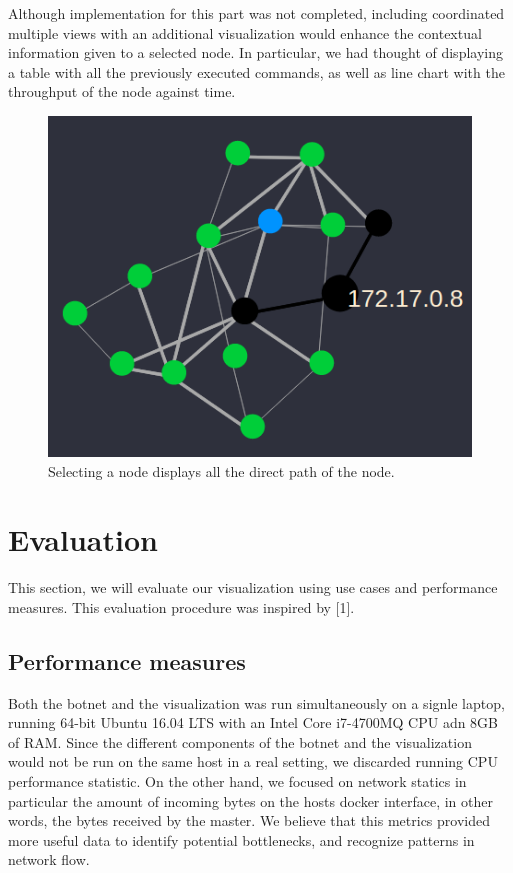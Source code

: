 \documentclass{proc}
\begin{document}
Although implementation for this part was not completed, including coordinated multiple views with an additional visualization would enhance the contextual information given to a selected node. In particular, we had thought of displaying a table with all the previously executed commands, as
well as line chart with the throughput of the node against time.

\begin{figure}
  \includegraphics[width=\linewidth]{network_select.png}
  \caption{Selecting a node displays all the direct path of the node.}
  \label{fig3 :node select}
\end{figure}


\section{Evaluation}
This section, we will evaluate our visualization using use cases and performance measures. This evaluation procedure was inspired by [1].

\subsection{Performance measures}



Both the botnet and the visualization was run simultaneously on a signle laptop, running 64-bit Ubuntu 16.04 LTS with an Intel Core i7-4700MQ CPU adn 8GB of RAM. Since the different components of the botnet and the visualization would not be run on the same host in a real setting, we discarded running CPU performance statistic. On the other hand, we focused on network statics in particular the amount of incoming bytes on the hosts docker interface, in other words, the bytes received by the master. We believe that this metrics provided more useful data to identify potential bottlenecks, and recognize patterns in network flow.
\end{document}
